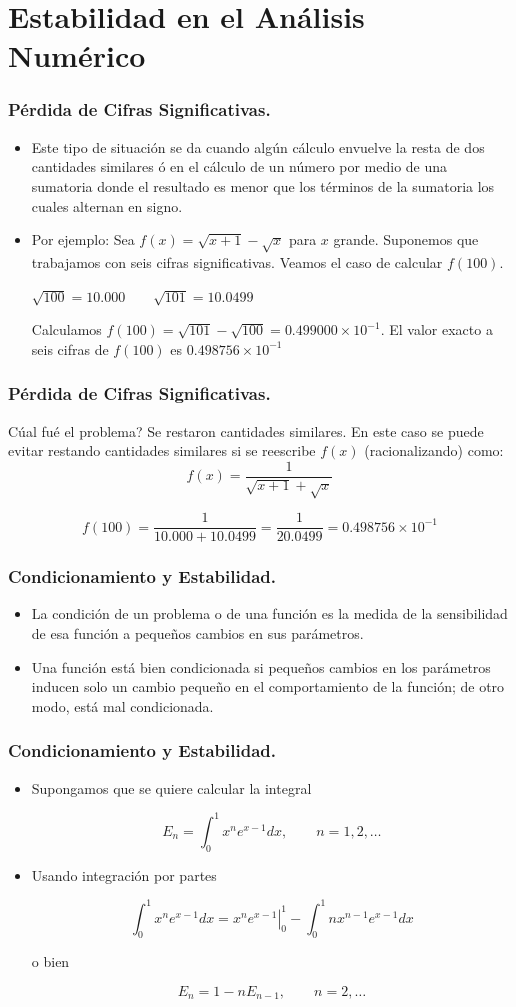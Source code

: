 \documentclass{beamer}
\begin{document}
\section{Estabilidad en el An\'alisis Num\'erico}
\frame
{
  \frametitle{P\'erdida de Cifras Significativas.}
\begin{itemize}

  \item<1-> Este tipo de situaci\'on se da cuando alg\'un c\'alculo envuelve la resta de dos cantidades similares \'o en el c\'alculo de un n\'umero por medio de una sumatoria donde el resultado es menor que los t\'erminos de la sumatoria los cuales alternan en signo.

  \item<2-> Por ejemplo: Sea $f(x)=\sqrt{x+1}-\sqrt{x}$ para $x$ grande. Suponemos que trabajamos con seis cifras significativas. Veamos el caso de calcular $f(100)$.

  $\sqrt{100}=10.000 \qquad \sqrt{101}=10.0499$

  Calculamos $f(100) = \sqrt{101}-\sqrt{100} = 0.499000\times10^{-1}$. El valor exacto a seis cifras de $f(100)$ es $0.498756\times10^{-1}$
\end{itemize}

}
\frame
{
  \frametitle{P\'erdida de Cifras Significativas.}
\textquestiondown C\'ual fu\'e el problema? Se restaron cantidades similares. En este caso se puede evitar restando cantidades similares si se reescribe $f(x)$ (racionalizando) como:
$$
f(x)=\frac{1}{\sqrt{x+1}+\sqrt{x}}
$$  

$$
f(100)=\frac{1}{10.000 +10.0499 } = \frac{1}{20.0499} = 0.498756\times10^{-1}
$$
}
\frame
{
  \frametitle{Condicionamiento y Estabilidad.}

  \begin{itemize}
    \item<1-> La condici\'on de un problema o de una funci\'on es la medida de la sensibilidad de esa funci\'on a peque\~nos cambios en sus par\'ametros.
    \item<2-> Una funci\'on est\'a bien condicionada si peque\~nos cambios en los par\'ametros inducen solo un cambio peque\~no en el comportamiento de la funci\'on; de otro modo, est\'a mal condicionada.
  \end{itemize}
}
\frame
{
  \frametitle{Condicionamiento y Estabilidad.} 
  \begin{itemize}
    \item<1-> Supongamos que se quiere calcular la integral
    \begin{block}{}
    $$
      E_n = \int_0^1x^ne^{x-1}dx, \qquad n=1,2,\ldots
    $$  
    \end{block}
    \item<2->Usando integraci\'on por partes
    \begin{block}{}
      $$
      \int_0^1x^ne^{x-1}dx = \displaystyle \left. x^ne^{x-1}\right|_0^1 - \int_0^1nx^{n-1}e^{x-1}dx
      $$
    \end{block}
    o bien 
    \begin{block}{}
    $$
    E_n = 1 - nE_{n-1}, \qquad n=2,\ldots
    $$
    \end{block}
  \end{itemize}
}
\end{document}
